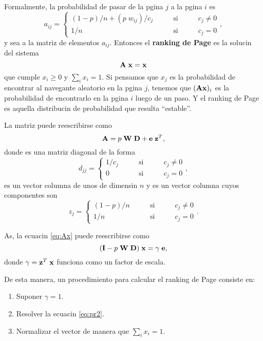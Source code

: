 Formalmente, la probabilidad de pasar de la pgina $j$ a la pgina $i$ es
\begin{equation*}
a_{ij} = \left\lbrace 
\begin{array}{lcl}
(1-p)/n + (p \; w_{ij})/c_j & \qquad \text{si} \qquad & c_j \neq 0 \\
1/n & \qquad \text{si} \qquad & c_j = 0 
\end{array}
\right. ,
\end{equation*}
y sea \mA{} a la matriz de elementos $a_{ij}$. Entonces el \textbf{ranking de Page} es la solucin del sistema
\begin{equation}
\mA \; \vx = \vx
\label{eq:Ax}
\end{equation}
que cumple $x_i \geq 0$ y $\sum_i x_i =1$. Si pensamos que $x_j$ es la probabilidad de encontrar al navegante aleatorio en la pgina $j$, tenemos que $({\bf A} {\bf x})_i$ es la probabilidad de encontrarlo en la pgina $i$ luego de un paso. Y el ranking de Page es aquella distribucin de probabilidad que resulta ``estable''.


La matriz \mA{} puede reescribirse como
\begin{equation*}
\mA = p \; \mW \; \mD + \ve \; \vz^T,
\end{equation*}
donde \mD{} es una matriz diagonal de la forma
\begin{equation*}
d_{jj} = \left\lbrace 
\begin{array}{lcl}
1/c_j & \qquad \text{si} \qquad & c_j \neq 0 \\
0 & \qquad \text{si} \qquad & c_j = 0 
\end{array}
\right. ,
\end{equation*}
\ve{} es un vector columna de unos de dimensin $n$ y \vz{} es un vector columna cuyos componentes son
\begin{equation*}
z_{j} = \left\lbrace 
\begin{array}{lcl}
(1-p)/n & \qquad \text{si} \qquad & c_j \neq 0 \\
1/n & \qquad \text{si} \qquad & c_j = 0 
\end{array}
\right. .
\end{equation*}

As, la ecuacin \eqref{eq:Ax} puede reescribirse como
\begin{equation}
(\mI - p \; \mW \; \mD) \; \vx = \gamma \; \ve,
\label{eq:pr2}
\end{equation}
donde $\gamma = {\bf z}^T \; {\bf x}$ funciona como un factor de escala. 

De esta manera, un procedimiento para calcular el ranking de Page consiste en:
\begin{enumerate}
	\item Suponer $\gamma = 1$.
	\item Resolver la ecuacin \eqref{eq:pr2}.
	\item Normalizar el vector \vx{} de manera que $\sum_i x_i =1$.
\end{enumerate}

